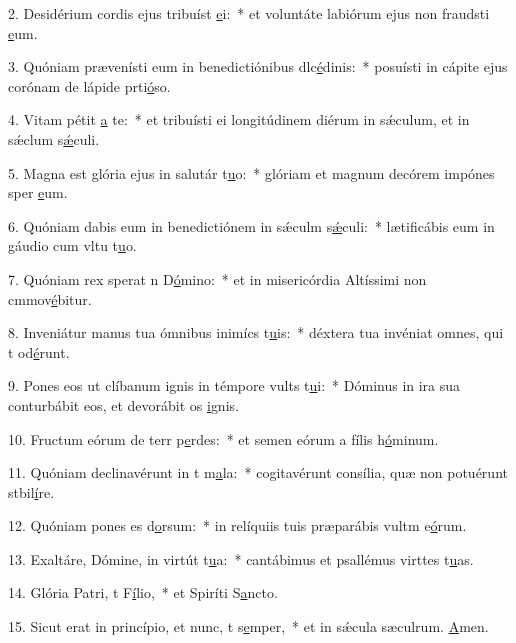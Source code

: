 2. Desidérium cordis ejus tribuíst \uline{e}i:~* et voluntáte labiórum ejus non fraudsti \uline{e}um.\par 
3. Quóniam prævenísti eum in benedictiónibus dlc\uline{é}dinis:~* posuísti in cápite ejus corónam de lápide prti\uline{ó}so.\par 
4. Vitam pétit \uline{a} te:~* et tribuísti ei longitúdinem diérum in sǽculum, et in sǽclum s\uline{ǽ}culi.\par 
5. Magna est glória ejus in salutár t\uline{u}o:~* glóriam et magnum decórem impónes sper \uline{e}um.\par 
6. Quóniam dabis eum in benedictiónem in sǽculm s\uline{ǽ}culi:~* lætificábis eum in gáudio cum vltu t\uline{u}o.\par 
7. Quóniam rex sperat n D\uline{ó}mino:~* et in misericórdia Altíssimi non cmmov\uline{é}bitur.\par 
8. Inveniátur manus tua ómnibus inimícs t\uline{u}is:~* déxtera tua invéniat omnes, qui t od\uline{é}runt.\par 
9. Pones eos ut clíbanum ignis in témpore vults t\uline{u}i:~* Dóminus in ira sua conturbábit eos, et devorábit os \uline{i}gnis.\par 
10. Fructum eórum de terr p\uline{e}rdes:~* et semen eórum a fílis h\uline{ó}minum.\par 
11. Quóniam declinavérunt in t m\uline{a}la:~* cogitavérunt consília, quæ non potuérunt stbil\uline{í}re.\par 
12. Quóniam pones es d\uline{o}rsum:~* in relíquiis tuis præparábis vultm e\uline{ó}rum.\par 
13. Exaltáre, Dómine, in virtút t\uline{u}a:~* cantábimus et psallémus virttes t\uline{u}as.\par 
14. Glória Patri, t F\uline{í}lio,~* et Spiríti S\uline{a}ncto.\par 
15. Sicut erat in princípio, et nunc, t s\uline{e}mper,~* et in sǽcula sæculrum. \uline{A}men.\par 
